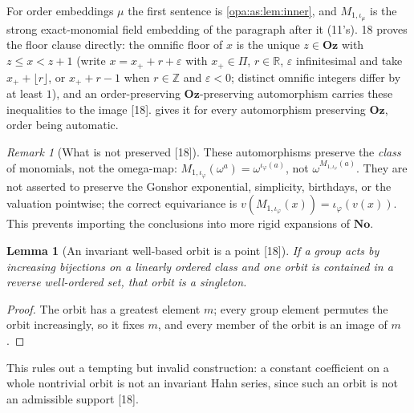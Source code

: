 \documentclass[11pt,oneside]{article}
\numberwithin{equation}{section}
\newtheorem{lemma}[lemma]{Lemma}
\theoremstyle{definition}
\theoremstyle{remark}
\newtheorem{remark}[remark]{Remark}
\newcommand{\No}{\mathbf{No}}
\newcommand{\Oz}{\mathbf{Oz}}
\newcommand{\R}{\mathbb R}
\newcommand{\Z}{\mathbb Z}
\newcommand{\src}[1]{\textup{\textsf{\small[#1]}}}
\begin{document}
For order embeddings $\mu$ the first sentence is \cref{opa:as:lem:inner}, and $M_{1,\iota_\mu}$ is the strong exact-monomial field
embedding of the paragraph after it (11's). 18 proves the floor clause directly: the omnific floor of $x$ is the unique $z\in\Oz$ with
$z\le x<z+1$ (write $x=x_++r+\varepsilon$ with $x_+\in\Pi$, $r\in\R$, $\varepsilon$ infinitesimal and take $x_++\lfloor r\rfloor$,
or $x_++r-1$ when $r\in\Z$ and $\varepsilon<0$; distinct omnific integers differ by at least $1$), and an order-preserving
$\Oz$-preserving automorphism carries these inequalities to the image \src{18}.  gives it for every
automorphism preserving $\Oz$, order being automatic.

\begin{remark}[What is not preserved \src{18}]\label{opa:es:rem:notpreserved}
These automorphisms preserve the \emph{class} of monomials, not the omega-map: $M_{1,\iota_\varphi}(\omega^a)=\omega^{\iota_\varphi(a)}$,
not $\omega^{M_{1,\iota_\varphi}(a)}$. They are not asserted to preserve the Gonshor exponential, simplicity, birthdays, or the valuation
pointwise; the correct equivariance is $v(M_{1,\iota_\varphi}(x))=\iota_\varphi(v(x))$. This prevents importing the conclusions into more
rigid expansions of $\No$.
\end{remark}

\begin{lemma}[An invariant well-based orbit is a point \src{18}]\label{opa:es:lem:orbit}
If a group acts by increasing bijections on a linearly ordered class and one orbit is contained in a reverse well-ordered set, that
orbit is a singleton.
\end{lemma}
\begin{proof}
The orbit has a greatest element $m$; every group element permutes the orbit increasingly, so it fixes $m$, and every member of the
orbit is an image of $m$.
\end{proof}

This rules out a tempting but invalid construction: a constant coefficient on a whole nontrivial orbit is not an invariant Hahn
series, since such an orbit is not an admissible support \src{18}.
\end{document}
